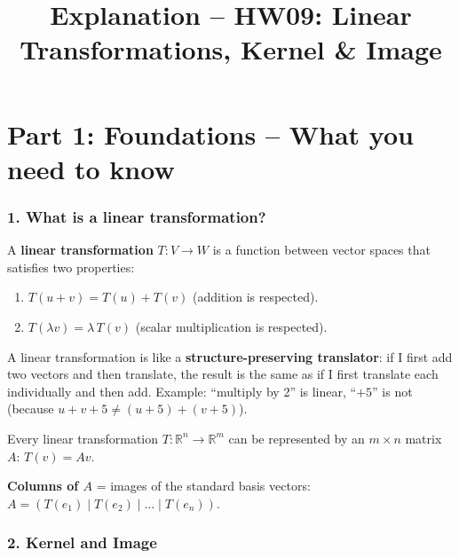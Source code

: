 \documentclass[a4paper,12pt]{article}
\title{Explanation -- HW09: Linear Transformations, Kernel \& Image}
\author{}
\date{}
\begin{document}
\maketitle

\part*{Part 1: Foundations -- What you need to know}

\section*{1. What is a linear transformation?}

A \textbf{linear transformation} $T \colon V \to W$ is a function between vector spaces that satisfies two properties:
\begin{enumerate}[nosep]
    \item $T(u + v) = T(u) + T(v)$ (addition is respected).
    \item $T(\lambda v) = \lambda \, T(v)$ (scalar multiplication is respected).
\end{enumerate}

\begin{analogie}
A linear transformation is like a \textbf{structure-preserving translator}: if I first add two vectors and then translate, the result is the same as if I first translate each individually and then add. Example: ``multiply by 2'' is linear, ``$+5$'' is not (because $u + v + 5 \neq (u+5) + (v+5)$).
\end{analogie}

\begin{merkbox}[title={Representation matrix}]
Every linear transformation $T \colon \mathbb{R}^n \to \mathbb{R}^m$ can be represented by an $m \times n$ matrix $A$: $T(v) = A v$.

\medskip
\textbf{Columns of $A$} = images of the standard basis vectors: $A = (T(e_1) \mid T(e_2) \mid \dots \mid T(e_n))$.
\end{merkbox}

\section*{2. Kernel and Image}
\end{document}
